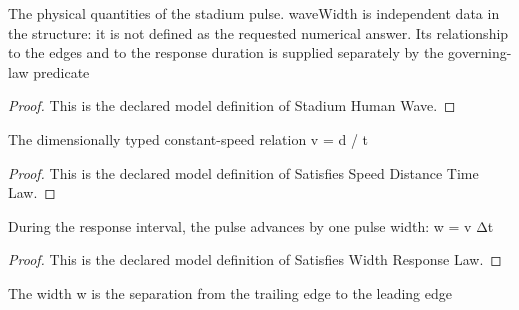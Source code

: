 \begin{definition}
  \label{def:physics:phyx-mini-0285:phyxminiproblems-problemphyxmini0285-stadiumhumanwave}
  The physical quantities of the stadium pulse. waveWidth is independent data in the structure: it is not defined as the requested numerical answer. Its relationship to the edges and to the response duration is supplied separately by the governing-law predicate
\end{definition}
\begin{proof}
  This is the declared model definition of Stadium Human Wave.
\end{proof}
\begin{definition}
  \label{def:physics:phyx-mini-0285:phyxminiproblems-problemphyxmini0285-satisfiesspeeddistancetimelaw}
  The dimensionally typed constant-speed relation v = d / t
\end{definition}
\begin{proof}
  This is the declared model definition of Satisfies Speed Distance Time Law.
\end{proof}
\begin{definition}
  \label{def:physics:phyx-mini-0285:phyxminiproblems-problemphyxmini0285-satisfieswidthresponselaw}
  During the response interval, the pulse advances by one pulse width: w = v Δt
\end{definition}
\begin{proof}
  This is the declared model definition of Satisfies Width Response Law.
\end{proof}
\begin{definition}
  \label{def:physics:phyx-mini-0285:phyxminiproblems-problemphyxmini0285-satisfiesedgeseparationlaw}
  The width w is the separation from the trailing edge to the leading edge
\end{definition}
